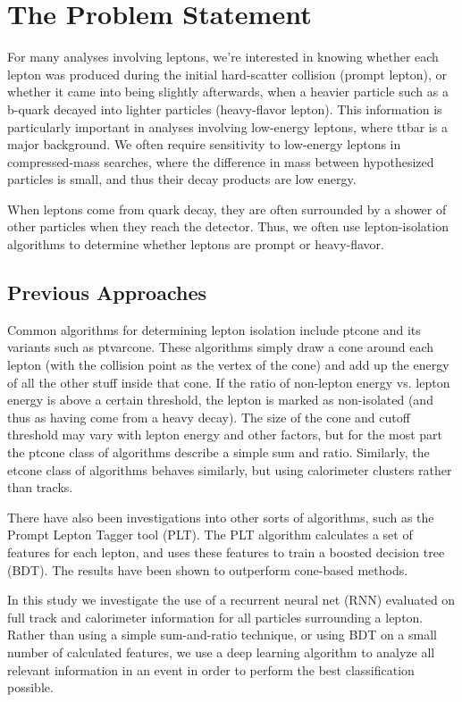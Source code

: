 \chapter{The Problem Statement}

For many analyses involving leptons, we're interested in knowing whether each lepton was produced during the initial hard-scatter collision (prompt lepton), or whether it came into being slightly afterwards, when a heavier particle such as a b-quark decayed into lighter particles (heavy-flavor lepton). This information is particularly important in analyses involving low-energy leptons, where ttbar is a major background. We often require sensitivity to low-energy leptons in compressed-mass searches, where the difference in mass between hypothesized particles is small, and thus their decay products are low energy.

When leptons come from quark decay, they are often surrounded by a shower of other particles when they reach the detector. Thus, we often use lepton-isolation algorithms to determine whether leptons are prompt or heavy-flavor.

\section{Previous Approaches}

Common algorithms for determining lepton isolation include ptcone and its variants such as ptvarcone. These algorithms simply draw a cone around each lepton (with the collision point as the vertex of the cone) and add up the energy of all the other stuff inside that cone. If the ratio of non-lepton energy vs. lepton energy is above a certain threshold, the lepton is marked as non-isolated (and thus as having come from a heavy decay). The size of the cone and cutoff threshold may vary with lepton energy and other factors, but for the most part the ptcone class of algorithms describe a simple sum and ratio. Similarly, the etcone class of algorithms behaves similarly, but using calorimeter clusters rather than tracks.

There have also been investigations into other sorts of algorithms, such as the Prompt Lepton Tagger tool (PLT). The PLT algorithm calculates a set of features for each lepton, and uses these features to train a boosted decision tree (BDT). The results have been shown to outperform cone-based methods.

In this study we investigate the use of a recurrent neural net (RNN) evaluated on full track and calorimeter information for all particles surrounding a lepton. Rather than using a simple sum-and-ratio technique, or using BDT on a small number of calculated features, we use a deep learning algorithm to analyze all relevant information in an event in order to perform the best classification possible.

